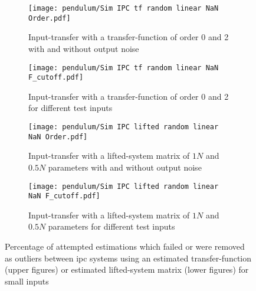 \begin{figure}
    \centering
    \begin{subfigure}[t]{0.495\textwidth}
        \centering
	        \texttt{[image: pendulum/Sim IPC tf random linear NaN Order.pdf]}
        \caption{Input-transfer with a transfer-function of order 0 and 2 with and without output noise}
    \end{subfigure}
    \hfill
    \begin{subfigure}[t]{0.495\textwidth}
        \centering
	        \texttt{[image: pendulum/Sim IPC tf random linear NaN F\_cutoff.pdf]}
        \caption{Input-transfer with a transfer-function of order 0 and 2 for different test inputs}
    \end{subfigure}
    \hfill
    \medskip
    \begin{subfigure}[t]{0.495\textwidth}
        \centering
	        \texttt{[image: pendulum/Sim IPC lifted random linear NaN Order.pdf]}
        \caption{Input-transfer with a lifted-system matrix of $1N$ and $0.5N$ parameters with and without output noise}
    \end{subfigure}
    \hfill
    \begin{subfigure}[t]{0.495\textwidth}
        \centering
	        \texttt{[image: pendulum/Sim IPC lifted random linear NaN F\_cutoff.pdf]}
        \caption{Input-transfer with a lifted-system matrix of $1N$ and $0.5N$ parameters for different test inputs}
    \end{subfigure}
    \caption[IPC -- Unsuccessful Trajectory Transfer (Low Amplitude)] {Percentage of attempted estimations which failed or were removed as outliers between \acrshort{ipc} systems using an estimated transfer-function (upper figures) or estimated lifted-system matrix (lower figures) for small inputs}
    \label{fig:sim2_results_nan}
\end{figure}


